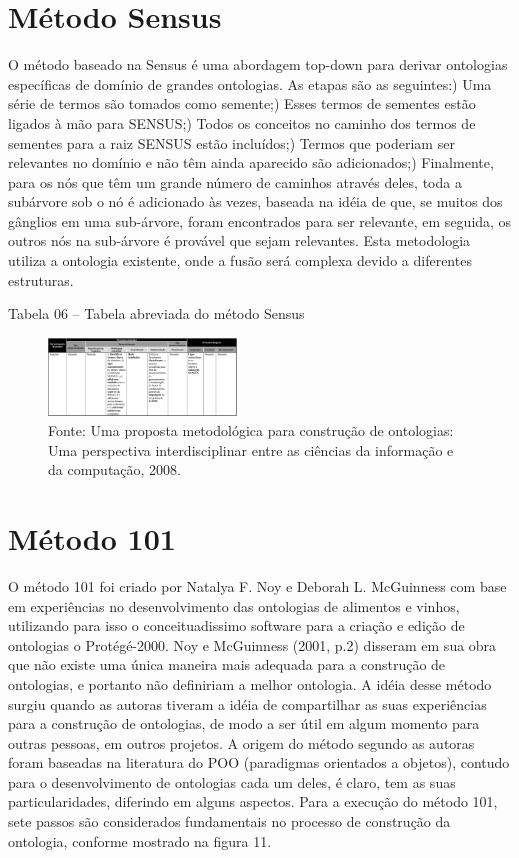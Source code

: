 \documentclass[a4paper]{report}
\begin{document}
\section{Método Sensus} 
\qquad O método baseado na Sensus é uma abordagem top-down para derivar ontologias específicas de domínio de grandes ontologias. As etapas são as seguintes:) Uma série de termos são tomados como semente;) Esses termos de sementes estão ligados à mão para SENSUS;) Todos os conceitos no caminho dos termos de sementes para a raiz SENSUS estão incluídos;) Termos que poderiam ser relevantes no domínio e não têm ainda aparecido são adicionados;) Finalmente, para os nós que têm um grande número de caminhos através deles,
toda a subárvore sob o nó é adicionado às vezes, baseada na idéia de que, se muitos dos gânglios em uma sub-árvore, foram encontrados para ser relevante, em seguida, os outros nós na sub-árvore é provável que sejam relevantes. Esta metodologia utiliza a ontologia existente, onde a fusão será complexa devido a diferentes estruturas.

Tabela 06 – Tabela abreviada do método Sensus

\begin{figure}[h] 
\centering %
\includegraphics[width=5cm]{Figuras/10.png} %
\caption{Fonte: Uma proposta metodológica para construção de ontologias: Uma perspectiva interdisciplinar entre as ciências da informação e da computação, 2008.}
\end{figure}

\section{Método 101} 
\qquad O método 101 foi criado por  Natalya F. Noy e Deborah L. McGuinness com base em experiências no desenvolvimento das ontologias de alimentos e vinhos, utilizando para isso o conceituadissimo software para a criação e edição de ontologias o Protégé-2000. Noy e McGuinness (2001, p.2) disseram em sua obra que não existe uma única maneira mais adequada para a construção de ontologias, e portanto não definiriam a melhor ontologia. A idéia desse método surgiu quando as autoras tiveram a idéia de compartilhar  as suas experiências para a construção de ontologias, de modo a ser útil em algum momento para outras pessoas, em outros projetos. A origem do método segundo as autoras foram baseadas na literatura do POO (paradigmas orientados a objetos), contudo para o desenvolvimento de ontologias cada um deles, é claro, tem as suas particularidades, diferindo em alguns aspectos. Para a execução do método 101, sete passos são considerados fundamentais no processo de construção da ontologia, conforme mostrado na figura 11.
\end{document}
